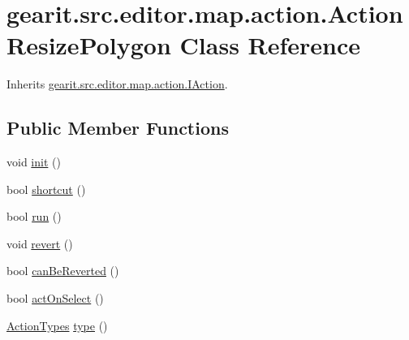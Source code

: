 \hypertarget{classgearit_1_1src_1_1editor_1_1map_1_1action_1_1_action_resize_polygon}{\section{gearit.\+src.\+editor.\+map.\+action.\+Action\+Resize\+Polygon Class Reference}
\label{classgearit_1_1src_1_1editor_1_1map_1_1action_1_1_action_resize_polygon}
}


Inherits \hyperlink{interfacegearit_1_1src_1_1editor_1_1map_1_1action_1_1_i_action}{gearit.\+src.\+editor.\+map.\+action.\+I\+Action}.

\subsection*{Public Member Functions}
\begin{DoxyCompactItemize}
\item 
void \hyperlink{classgearit_1_1src_1_1editor_1_1map_1_1action_1_1_action_resize_polygon_aaa027d42f32ab431750a4a682e579ed6}{init} ()
\item 
bool \hyperlink{classgearit_1_1src_1_1editor_1_1map_1_1action_1_1_action_resize_polygon_a3abed997457531601190827982be1ad8}{shortcut} ()
\item 
bool \hyperlink{classgearit_1_1src_1_1editor_1_1map_1_1action_1_1_action_resize_polygon_a4f67bb0829473f712363911f0901a1ff}{run} ()
\item 
void \hyperlink{classgearit_1_1src_1_1editor_1_1map_1_1action_1_1_action_resize_polygon_ad802b402cc69fec54a84e99061ae63ef}{revert} ()
\item 
bool \hyperlink{classgearit_1_1src_1_1editor_1_1map_1_1action_1_1_action_resize_polygon_a02031f5af67a62a99c20d42b4fbe5243}{can\+Be\+Reverted} ()
\item 
bool \hyperlink{classgearit_1_1src_1_1editor_1_1map_1_1action_1_1_action_resize_polygon_abe10d575d24b431500d5333d740a59c2}{act\+On\+Select} ()
\item 
\hyperlink{namespacegearit_1_1src_1_1editor_1_1map_1_1action_af036712a7d960b13d1e31954e65c00e3}{Action\+Types} \hyperlink{classgearit_1_1src_1_1editor_1_1map_1_1action_1_1_action_resize_polygon_a19dee6dafae1b695a7368760937e99c4}{type} ()
\end{DoxyCompactItemize}


